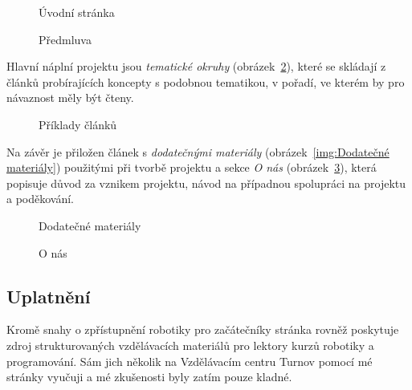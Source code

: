 \documentclass[a4paper, 12pt]{article}
\begin{document}
  \begin{figure}[H]
      \caption{Úvodní stránka} \label{img:Úvodní stránka}
    \endminipage\hfill
      \caption{Předmluva} \label{img:Předmluva}
    \endminipage
  \end{figure}

  Hlavní náplní projektu jsou \emph{tematické okruhy} (obrázek~\ref{img:Příklady článků}), které se skládají z článků probírajících koncepty s podobnou tematikou, v pořadí, ve kterém by pro návaznost měly být čteny.

  \begin{figure}[H]
    \centering

    \hfill
    \hfill

    \caption{Příklady článků}%
    \label{img:Příklady článků}%
  \end{figure}

  Na závěr je přiložen článek s \emph{dodatečnými materiály} (obrázek~\ref{img:Dodatečné materiály}) použitými při tvorbě projektu a sekce \emph{O nás} (obrázek~\ref{img:O nás}), která popisuje důvod za vznikem projektu, návod na případnou spolupráci na projektu a poděkování.

  \begin{figure}[H]
      \caption{Dodatečné materiály} \label{img:Dodatečné materiály}
    \endminipage\hfill
      \caption{O nás} \label{img:O nás}
    \endminipage
  \end{figure}


  \subsection{Uplatnění}
  Kromě snahy o zpřístupnění robotiky pro začátečníky stránka rovněž poskytuje zdroj strukturovaných vzdělávacích materiálů pro lektory kurzů robotiky a programování. Sám jich několik na Vzdělávacím centru Turnov pomocí mé stránky vyučuji a mé zkušenosti byly zatím pouze kladné.
\end{document}
